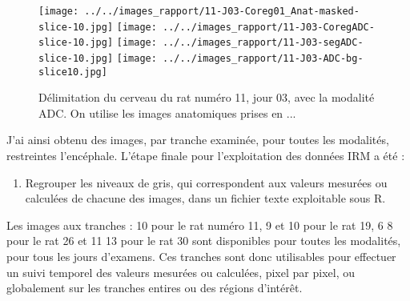 \setcounter{stock}{\value{enumi}}

\begin{figure}[!h]%
\texttt{[image: ../../images\_rapport/11-J03-Coreg01\_Anat-masked-slice-10.jpg]}
\hfill
\texttt{[image: ../../images\_rapport/11-J03-CoregADC-slice-10.jpg]}
\hfill
\texttt{[image: ../../images\_rapport/11-J03-segADC-slice-10.jpg]}
\hfill
\texttt{[image: ../../images\_rapport/11-J03-ADC-bg-slice10.jpg]}
\caption{D\'elimitation du cerveau du rat num\'ero 11, jour 03, avec la modalit\'e ADC. On utilise les images anatomiques prises en ...}%
\label{cephcer}
\end{figure}

\FloatBarrier
J'ai ainsi obtenu des images, par tranche examin\'ee, pour toutes les modalit\'es, restreintes  l'enc\'ephale. L'\'etape finale pour l'exploitation des donn\'ees IRM a \'et\'e :
\begin{enumerate}
\setcounter{enumi}{\value{stock}}
\item Regrouper les niveaux de gris, qui correspondent aux valeurs mesur\'ees ou calcul\'ees de chacune des images, dans un fichier texte exploitable sous R.
\end{enumerate}

\etoile
Les images aux tranches : 10 pour le rat num\'ero 11, 9 et 10 pour le rat 19, 6  8 pour le rat 26 et 11  13 pour le rat 30 sont disponibles pour toutes les modalit\'es, %
pour tous les jours d'examens. %
Ces tranches sont donc utilisables pour effectuer un suivi temporel des valeurs mesur\'ees ou calcul\'ees, pixel par pixel, %
ou globalement sur les tranches entires ou des r\'egions d'int\'er\^et.

